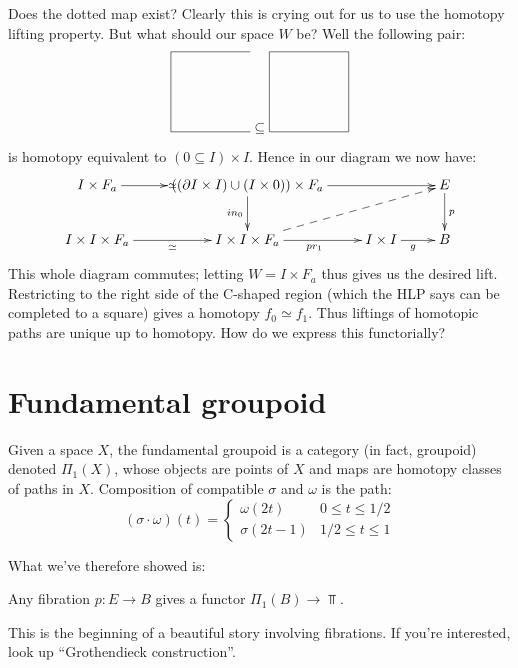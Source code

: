 Does the dotted map exist? Clearly this is crying out for us to use the homotopy lifting property. But what should our space $W$ be? Well the following pair:
\begin{equation*}
    \begin{tikzpicture}
	\draw (2,2) -- (0,2) -- (0,0) -- (2,0);
    \end{tikzpicture}\subseteq
    \begin{tikzpicture}
	\draw (0,0) -- (0,2) -- (2,2) -- (2,0) -- (0,0);
    \end{tikzpicture}
\end{equation*}
is homotopy equivalent to $(0\subseteq I)\times I$. Hence in our diagram we now have:
\begin{equation*}
    \xymatrix{
	I\times F_a\ar[r]|{\simeq} & ((\partial I\times I)\cup (I\times 0))\times F_a\ar[d]_{in_0}\ar[rr] & & E\ar[d]^p\\
	I\times I\times F_a\ar[r]_{\simeq} & I\times I\times F_a\ar[r]_{pr_1}\ar@{-->}[urr] & I\times I\ar[r]_g & B
    }
\end{equation*}
This whole diagram commutes; letting $W=I\times F_a$ thus gives us the desired lift. Restricting to the right side of the C-shaped region (which the HLP says can be completed to a square) gives a homotopy $f_0\simeq f_1$. Thus liftings of homotopic paths are unique up to homotopy. How do we express this functorially?
\section{Fundamental groupoid}
\begin{definition}
    Given a space $X$, the fundamental groupoid is a category (in fact, groupoid) denoted $\Pi_1(X)$, whose objects are points of $X$ and maps are homotopy classes of paths in $X$. Composition of compatible $\sigma$ and $\omega$ is the path:
    \begin{equation*}
	(\sigma\cdot\omega)(t) = \begin{cases}
	    \omega(2t) & 0\leq t\leq 1/2\\
	    \sigma(2t - 1) & 1/2\leq t\leq 1
	\end{cases}
    \end{equation*}
\end{definition}
What we've therefore showed is:
\begin{prop}
    Any fibration $p:E\to B$ gives a functor $\Pi_1(B)\to \Top$.
\end{prop}
This is the beginning of a beautiful story involving fibrations. If you're interested, look up ``Grothendieck construction''.
